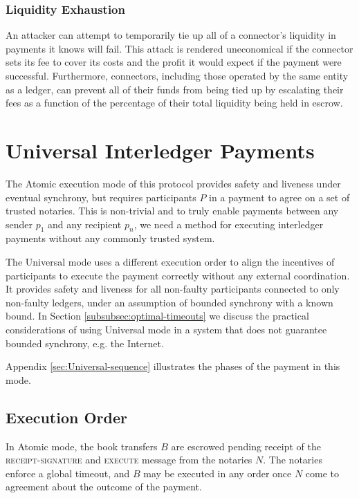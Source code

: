 \documentclass[letterpaper,twocolumn,10pt]{article}
\begin{document}
\subsubsection{Liquidity Exhaustion}

An attacker can attempt to temporarily tie up all of a connector's liquidity in payments it knows will fail. This attack is rendered uneconomical if the connector sets its fee to cover its costs and the profit it would expect if the payment were successful. Furthermore, connectors, including those operated by the same entity as a ledger, can prevent all of their funds from being tied up by escalating their fees as a function of the percentage of their total liquidity being held in escrow. 

\section{Universal Interledger Payments}
\label{sec:Universal}

The Atomic execution mode of this protocol provides safety and liveness under eventual synchrony, but requires participants $P$ in a payment to agree on a set of trusted notaries. This is non-trivial and to truly enable payments between any sender $p_1$ and any recipient $p_n$, we need a method for executing interledger payments without any commonly trusted system.

The Universal mode uses a different execution order to align the incentives of participants to execute the payment correctly without any external coordination. It provides safety and liveness for all non-faulty participants connected to only non-faulty ledgers, under an assumption of bounded synchrony with a known bound. In Section \ref{subsubsec:optimal-timeouts} we discuss the practical considerations of using Universal mode in a system that does not guarantee bounded synchrony, e.g. the Internet.

Appendix \ref{sec:Universal-sequence} illustrates the phases of the payment in this mode.


\subsection{Execution Order}

In Atomic mode, the book transfers $B$ are escrowed pending receipt of the \textsc{receipt-signature} and \textsc{execute} message from the notaries $N$. The notaries enforce a global timeout, and $B$ may be executed in any order once $N$ come to agreement about the outcome of the payment.
\end{document}
